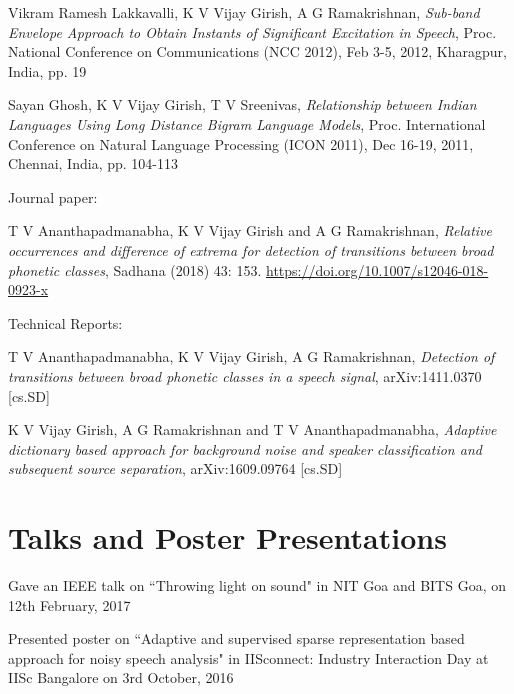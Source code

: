 \documentclass[line]{resume}
\begin{document}
{\begin{resume}
\begin{list2}
				
				\item
				Vikram Ramesh Lakkavalli, K V Vijay Girish, A G Ramakrishnan, \textit{Sub-band Envelope Approach to Obtain Instants of Significant Excitation in Speech}, Proc. National Conference on Communications (NCC 2012), Feb 3-5, 2012, Kharagpur, India, pp. 19
				
				
				\item Sayan Ghosh, K V Vijay Girish, T V Sreenivas, \textit{Relationship between Indian Languages Using Long Distance Bigram Language Models}, Proc. International Conference on Natural Language Processing (ICON
			2011), Dec 16-19, 2011, Chennai, India, pp. 104-113
			
			
			\end{list2}
			\vspace{-1mm}
			Journal paper:
			\begin{list2}
			\item T V Ananthapadmanabha, K V Vijay Girish and A G Ramakrishnan,  \textit{Relative occurrences and difference of extrema for detection of transitions between broad phonetic classes},  Sadhana
			 (2018) 43: 153. \url{https://doi.org/10.1007/s12046-018-0923-x}
			\end{list2}
		
			\vspace{-1mm}
		Technical Reports:
		\begin{list2}
		\item T V Ananthapadmanabha, K V Vijay Girish, A G Ramakrishnan, \textit{Detection of transitions between broad phonetic classes in a speech signal}, 	arXiv:1411.0370 [cs.SD]
		
		\item  K V Vijay Girish, A G Ramakrishnan and T V Ananthapadmanabha,  \textit{Adaptive dictionary based approach for background noise and speaker classification and subsequent source separation}, 	arXiv:1609.09764 [cs.SD]
		\end{list2}
			\vspace{-2.5mm}
			\section{\mysidestyle Talks and Poster Presentations} 
			\vspace{5mm}
			\begin{list2}
			\item Gave an IEEE talk on ``Throwing light on sound" in NIT Goa and BITS Goa, on 12th February, 2017
			\item Presented poster on ``Adaptive and supervised sparse representation based approach for noisy speech analysis"  in IISconnect: Industry Interaction Day at IISc  Bangalore on 3rd October, 2016 
			

\end{list2}
\end{resume}}
\end{document}
